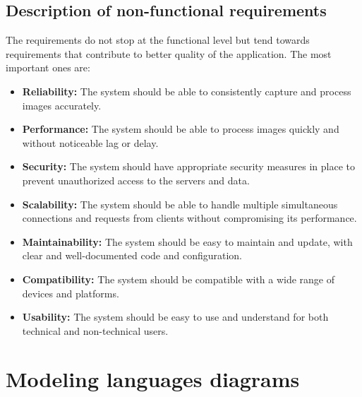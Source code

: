 \subsection{Description of non-functional requirements}
The requirements do not stop at the functional level but tend towards requirements that contribute to better quality of the application. The most important ones are:
\begin{itemize}
\item \textbf{Reliability:} The system should be able to consistently capture and process images accurately.
\item \textbf{Performance:} The system should be able to process images quickly and without noticeable lag or delay.
\item \textbf{Security:} The system should have appropriate security measures in place to prevent unauthorized access to the servers and data.
\item \textbf{Scalability:} The system should be able to handle multiple simultaneous connections and requests from clients without compromising its performance.
\item \textbf{Maintainability:} The system should be easy to maintain and update, with clear and well-documented code and configuration.
\item \textbf{Compatibility:} The system should be compatible with a wide range of devices and platforms.
\item \textbf{Usability:} The system should be easy to use and understand for both technical and non-technical users.
\end{itemize}

\section{Modeling languages diagrams}

